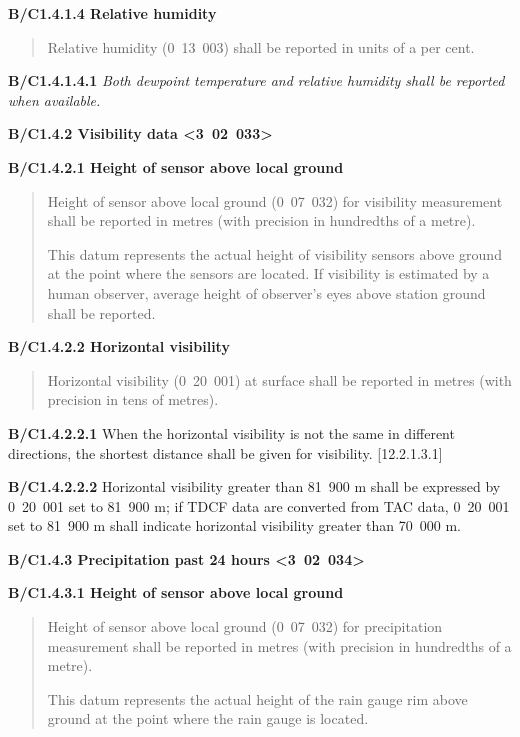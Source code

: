 \textbf{B/C1.4.1.4 Relative humidity}

\begin{quote}
Relative humidity (0~13~003) shall be reported in units of a per cent.
\end{quote}

\textbf{B/C1.4.1.4.1} \emph{Both dewpoint temperature and relative humidity shall be reported when available.}

\textbf{B/C1.4.2 Visibility data \textless3~02~033\textgreater{}}

\textbf{B/C1.4.2.1 Height of sensor above local ground}

\begin{quote}
Height of sensor above local ground (0~07~032) for visibility measurement shall be reported in metres (with precision in hundredths of a metre).

This datum represents the actual height of visibility sensors above ground at the point where the sensors are located. If visibility is estimated by a human observer, average height of observer's eyes above station ground shall be reported.
\end{quote}

\textbf{B/C1.4.2.2 Horizontal visibility}

\begin{quote}
Horizontal visibility (0~20~001) at surface shall be reported in metres (with precision in tens of metres).
\end{quote}

\textbf{B/C1.4.2.2.1} When the horizontal visibility is not the same in different directions, the shortest distance shall be given for visibility. {[}12.2.1.3.1{]}

\textbf{B/C1.4.2.2.2} Horizontal visibility greater than 81~900 m shall be expressed by 0~20~001 set to 81~900 m; if TDCF data are converted from TAC data, 0~20~001 set to 81~900 m shall indicate horizontal visibility greater than 70~000 m.

\textbf{B/C1.4.3 Precipitation past 24 hours \textless3~02~034\textgreater{}}

\textbf{B/C1.4.3.1 Height of sensor above local ground}

\begin{quote}
Height of sensor above local ground (0~07~032) for precipitation measurement shall be reported in metres (with precision in hundredths of a metre).

This datum represents the actual height of the rain gauge rim above ground at the point where the rain gauge is located.
\end{quote}

